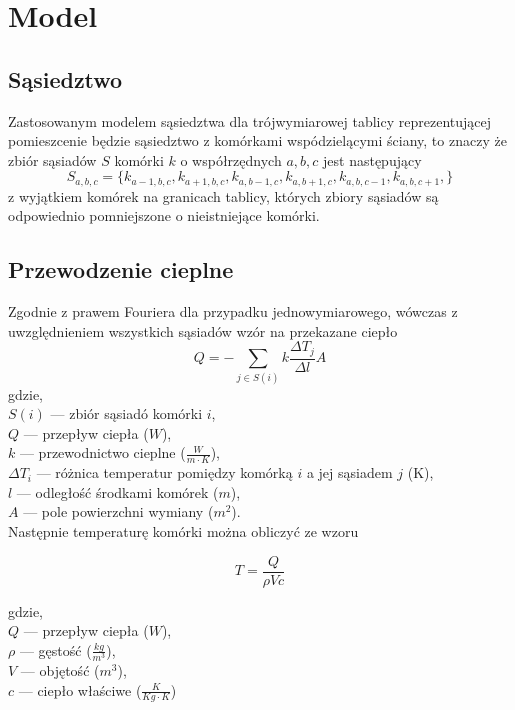 \documentclass{article}
\begin{document}
\section{Model}
\subsection{Sąsiedztwo}
Zastosowanym modelem sąsiedztwa dla trójwymiarowej tablicy reprezentującej pomieszcenie będzie sąsiedztwo z komórkami
wspódzielącymi ściany, to znaczy że zbiór sąsiadów $S$ komórki $k$ o współrzędnych $a,b,c$ jest następujący
$$S_{a,b,c}=\{k_{a-1,b,c}, k_{a+1,b,c}, k_{a,b-1,c}, k_{a,b+1,c}, k_{a,b,c-1}, k_{a,b,c+1}, \}$$
z wyjątkiem komórek na granicach tablicy, których zbiory sąsiadów są odpowiednio pomniejszone o nieistniejące komórki.

\subsection{Przewodzenie cieplne}
Zgodnie z prawem Fouriera dla przypadku jednowymiarowego, wówczas z uwzględnieniem wszystkich sąsiadów
wzór na przekazane ciepło
\begin{equation}
    \displaystyle Q=-\sum_{j \in S(i)}k\frac{\Delta T_j}{\Delta l}A
    \end{equation}
gdzie,\\
$S(i)$ --- zbiór sąsiadó komórki $i$, \\
$Q$ --- przepływ ciepła ($W$), \\
$k$ --- przewodnictwo cieplne ($\frac{W}{m \cdot K}$), \\
$\Delta T_i$ --- różnica temperatur pomiędzy komórką $i$ a jej sąsiadem $j$ (K), \\
$l$ --- odległość środkami komórek ($m$), \\
$A$ --- pole powierzchni wymiany ($m^2$). \\

Następnie temperaturę komórki można obliczyć ze wzoru

\begin{equation}
T=\frac{Q}{\rho V c}
\end{equation}

gdzie, \\
$Q$ --- przepływ ciepła ($W$), \\
$\rho$ --- gęstość ($\frac{kg}{m^3}$), \\
$V$ --- objętość ($m^3$), \\
$c$ --- ciepło właściwe ($\frac{K}{Kg\cdot K}$)
\end{document}

